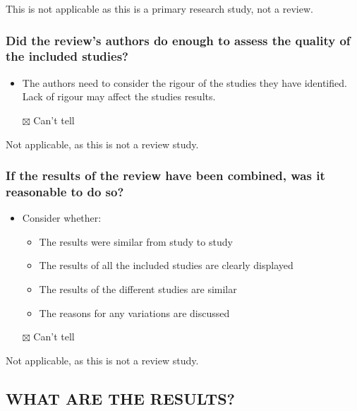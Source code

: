 \documentclass[
  doc, a4paper]{apa7}
\providecommand{\tightlist}{%
  \setlength{\itemsep}{0pt}\setlength{\parskip}{0pt}}
\begin{document}
This is not applicable as this is a primary research study, not a review.

\subsubsection{Did the review's authors do enough to assess the quality of the included studies?}\label{did-the-reviews-authors-do-enough-to-assess-the-quality-of-the-included-studies}

\begin{itemize}
\tightlist
\item
  The authors need to consider the rigour of the studies they have identified. Lack of rigour may affect the studies results.
\item[$\boxtimes$]
  Can't tell
\end{itemize}

Not applicable, as this is not a review study.

\subsubsection{If the results of the review have been combined, was it reasonable to do so?}\label{if-the-results-of-the-review-have-been-combined-was-it-reasonable-to-do-so}

\begin{itemize}
\tightlist
\item
  Consider whether:

  \begin{itemize}
  \tightlist
  \item
    The results were similar from study to study
  \item
    The results of all the included studies are clearly displayed
  \item
    The results of the different studies are similar
  \item
    The reasons for any variations are discussed
  \end{itemize}
\item[$\boxtimes$]
  Can't tell
\end{itemize}

Not applicable, as this is not a review study.

\subsection{WHAT ARE THE RESULTS?}\label{what-are-the-results}
\end{document}
